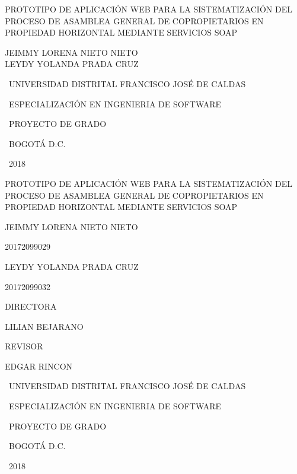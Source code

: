 \documentclass[letter,11pt,openany]{book}
\begin{document}
\begin{titlepage}
	\centering	
	{\scshape\LARGE PROTOTIPO DE APLICACIÓN WEB PARA LA SISTEMATIZACIÓN DEL PROCESO DE ASAMBLEA GENERAL DE COPROPIETARIOS EN PROPIEDAD HORIZONTAL MEDIANTE SERVICIOS SOAP \par}
	\vspace{7cm}
	{\scshape\Large JEIMMY LORENA NIETO NIETO\\
		LEYDY YOLANDA PRADA CRUZ\par}
	\vspace{7.5cm}
	
	{\Large\ UNIVERSIDAD DISTRITAL FRANCISCO JOSÉ DE CALDAS\par}
	{\Large\ ESPECIALIZACIÓN EN INGENIERIA DE SOFTWARE\par}
    {\Large\ PROYECTO DE GRADO\par}
	{\Large\ BOGOTÁ D.C.\par}
	{\Large\ 2018\par}	
\end{titlepage}

\begin{titlepage}
	\centering	
	{\scshape\LARGE PROTOTIPO DE APLICACIÓN WEB PARA LA SISTEMATIZACIÓN DEL PROCESO DE ASAMBLEA GENERAL DE COPROPIETARIOS EN PROPIEDAD HORIZONTAL MEDIANTE SERVICIOS SOAP \par}
	\vspace{4cm}
	{\scshape\Large JEIMMY LORENA NIETO NIETO\par}
	{\scshape\Large 20172099029\par}
	{\scshape\Large LEYDY YOLANDA PRADA CRUZ\par}
	{\scshape\Large 20172099032\par}
	\vspace{2.5cm}
	
	{\scshape\Large DIRECTORA\par}
	{\scshape\Large LILIAN BEJARANO\par}
	{\scshape\Large REVISOR\par}
	{\scshape\Large EDGAR RINCON\par}
	\vspace{2.5cm}
	
	{\Large\ UNIVERSIDAD DISTRITAL FRANCISCO JOSÉ DE CALDAS\par}
	{\Large\ ESPECIALIZACIÓN EN INGENIERIA DE SOFTWARE\par}
	{\Large\ PROYECTO DE GRADO\par}
	{\Large\ BOGOTÁ D.C.\par}
	{\Large\ 2018\par}	
\end{titlepage}
\end{document}
